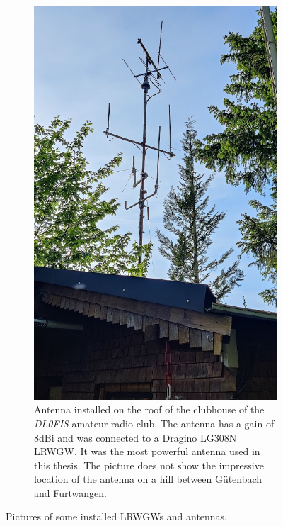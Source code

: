 \begin{figure}
\begin{subfigure}[t]{0.5\textwidth}
        \includegraphics[width=1\textwidth]{pictures/hardware/gateway-deployment/gateway_dl0fis_clubhouse.jpg}
        \caption{
            Antenna installed on the roof of the clubhouse of the \emph{DL0FIS} amateur radio club.
            The antenna has a gain of 8dBi and was connected to a Dragino LG308N \acl{LRWGW}.
            It was the most powerful antenna used in this thesis.
            The picture does not show the impressive location of the antenna on a hill between Gütenbach and Furtwangen.
        }\label{pic:antenna-dl0fis-clubhouse}
    \end{subfigure}

    \caption{Pictures of some installed \aclp{LRWGW} and antennas.}
\end{figure}

